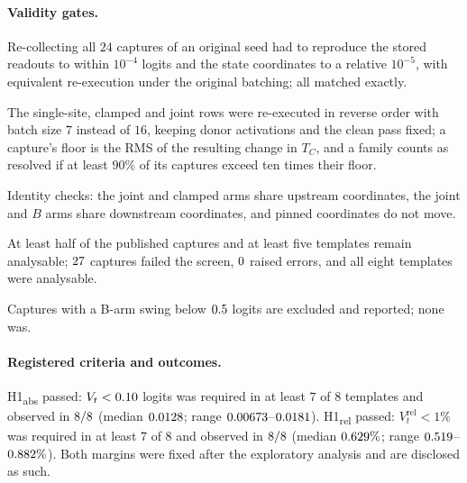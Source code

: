 \paragraph{Validity gates.}
\begin{description}[leftmargin=1.2em,itemsep=1pt,topsep=1pt,parsep=0pt,font=\normalfont]
\item[(V1)] Re-collecting all $24$ captures of an original seed had to reproduce the stored
readouts to within $10^{-4}$ logits and the state coordinates to a relative $10^{-5}$, with equivalent re-execution
under the original batching; all matched exactly.
\item[(V2)] The single-site, clamped and joint rows were re-executed in
reverse order with batch size $7$ instead of $16$, keeping donor activations and the clean pass fixed; a capture's floor
is the RMS of the resulting change in $T_C$, and a family counts as resolved if at least $90\%$ of its captures exceed
ten times their floor.
\item[(V3)] Identity checks: the joint and clamped arms share upstream coordinates, the joint and $B$
arms share downstream coordinates, and pinned coordinates do not move.
\item[(V4)] At least half of the published captures
and at least five templates remain analysable; $27$ captures failed the screen, $0$ raised errors,
and all eight templates were analysable.
\item[(V5)] Captures with a B-arm swing below $0.5$ logits are excluded and
reported; none was.
\end{description}

\paragraph{Registered criteria and outcomes.} H1\textsubscript{abs} passed: $V_t<0.10$ logits was required in
at least $7$ of $8$ templates and observed in $8/8$ (median $0.0128$; range $0.00673$--$0.0181$).
H1\textsubscript{rel} passed: $V_t^{\mathrm{rel}}<1\%$ was required in at least $7$ of $8$ and observed in $8/8$ (median $0.629\%$; range $0.519$--$0.882\%$). Both margins were fixed after the exploratory analysis and
are disclosed as such.

